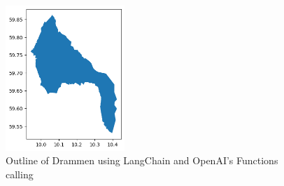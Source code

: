 \begin{figure}
    \centering
    \includegraphics[width=0.4\textwidth]{../figs/drammen_plot_langchain.png}
    \caption{Outline of Drammen using LangChain and OpenAI's Functions calling}
    \label{fig:drammen-plot-langchain}
\end{figure}

\glsresetall
